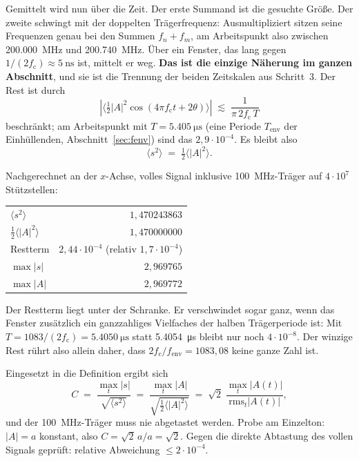 \documentclass[11pt,a4paper]{article}
\newcommand{\crest}{\ensuremath{C}}
\begin{document}
Gemittelt wird nun über die Zeit. Der erste Summand ist die gesuchte Größe.
Der zweite schwingt mit der doppelten Trägerfrequenz: Ausmultipliziert sitzen
seine Frequenzen genau bei den Summen $f_n+f_m$, am Arbeitspunkt also
zwischen \SI{200.000}{\mega\hertz} und \SI{200.740}{\mega\hertz}. Über ein
Fenster, das lang gegen $1/(2f_\mathrm{c}) \approx \SI{5}{\nano\second}$ ist,
mittelt er weg. \textbf{Das ist die einzige Näherung im ganzen Abschnitt}, und
sie ist die Trennung der beiden Zeitskalen aus Schritt~3. Der Rest ist durch
\begin{equation}
  \left|\bigl\langle \tfrac12|A|^2\cos(4\pi f_\mathrm{c}t+2\theta)\bigr\rangle\right|
  \;\lesssim\; \frac{1}{\pi\,2f_\mathrm{c}\,T}
  \label{eq:carrierrest}
\end{equation}
beschränkt; am Arbeitspunkt mit $T=\SI{5.405}{\micro\second}$ (eine Periode $T_\mathrm{env}$ der Einhüllenden, Abschnitt~\ref{sec:fenv}) sind das
$2{,}9\cdot10^{-4}$. Es bleibt also
\begin{equation}
  \bigl\langle s^2 \bigr\rangle \;=\; \tfrac12\bigl\langle |A|^2\bigr\rangle .
\end{equation}

Nachgerechnet an der $x$-Achse, volles Signal inklusive
\SI{100}{\mega\hertz}-Träger auf $4\cdot10^{7}$ Stützstellen:
\begin{center}
\begin{tabular}{@{}lr@{}}
  \toprule
  $\langle s^2\rangle$ & $1{,}470243863$\\
  $\tfrac12\langle|A|^2\rangle$ & $1{,}470000000$\\
  Restterm & $2{,}44\cdot10^{-4}$ \quad(relativ $1{,}7\cdot10^{-4}$)\\
  \midrule
  $\max|s|$ & $2{,}969765$\\
  $\max|A|$ & $2{,}969772$\\
  \bottomrule
\end{tabular}
\end{center}
Der Restterm liegt unter der Schranke. Er verschwindet sogar ganz, wenn das
Fenster zusätzlich ein ganzzahliges Vielfaches der halben Trägerperiode ist:
Mit $T = 1083/(2f_\mathrm{c}) = \SI{5.4050}{\micro\second}$ statt
\SI{5.4054}{\micro\second} bleibt nur noch $4\cdot10^{-8}$. Der winzige Rest
rührt also allein daher, dass $2f_\mathrm{c}/f_\mathrm{env} = 1083{,}08$
keine ganze Zahl ist.

Eingesetzt in die Definition ergibt sich
\begin{equation}
  \crest \;=\; \frac{\max_t|s|}{\sqrt{\langle s^2\rangle}}
  \;=\; \frac{\max_t|A|}{\sqrt{\tfrac12\langle |A|^2\rangle}}
  \;=\; \sqrt{2}\;\frac{\max_t |A(t)|}{\mathrm{rms}_t |A(t)|} ,
  \label{eq:crestenv}
\end{equation}
und der \SI{100}{\mega\hertz}-Träger muss nie abgetastet werden. Probe am
Einzelton: $|A| = a$ konstant, also $\crest = \sqrt{2}\,a/a = \sqrt{2}$.
Gegen die direkte Abtastung des vollen Signals geprüft: relative Abweichung
$\le 2\cdot10^{-4}$.
\end{document}
